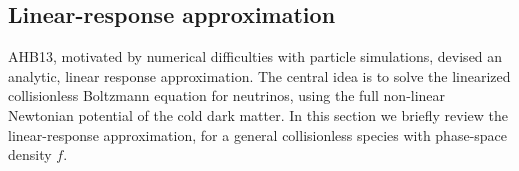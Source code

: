 \documentclass[useAMS, usenatbib]{mnras}
\newcommand{\bs}{\mathbf}
\begin{document}
%
%

\subsection{Linear-response approximation} \label{sec:analytic}

AHB13, motivated by numerical difficulties with particle simulations,
devised an analytic, linear response approximation. The central idea
is to solve the linearized collisionless Boltzmann equation for neutrinos,
using the full non-linear Newtonian potential of the cold dark matter.
In this section we briefly review the linear-response approximation,
for a general collisionless species with phase-space density $f$.
\end{document}
